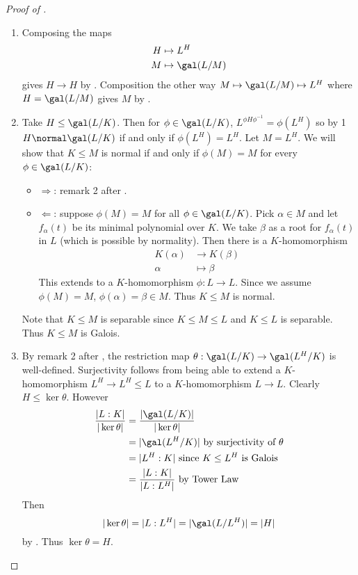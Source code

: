 \documentclass[a4paper]{article}
\begin{document}
\begin{proof}[Proof of ]\leavevmode
  \begin{enumerate}
  \item Composing the maps
    \begin{align*}
      H &\mapsto L^H \\
      M &\mapsto \gal(L/M)
    \end{align*}
    gives \(H \to H\) by . Composition the other way \(M \mapsto \gal(L/M) \mapsto L^H\) where \(H = \gal(L/M)\) gives \(M\) by .
  \item Take \(H \leq \gal(L/K)\). Then for \(\phi \in \gal(L/K)\), \(L^{\phi H \phi^{-1}} = \phi(L^H)\) so by 1 \(H \normal \gal(L/K)\) if and only if \(\phi(L^H) = L^H\). Let \(M = L^H\). We will show that \(K \leq M\) is normal if and only if \(\phi(M) = M\) for every \(\phi \in \gal(L/K)\):
    \begin{itemize}
    \item \(\Rightarrow\): remark 2 after .
    \item \(\Leftarrow\): suppose \(\phi(M) = M\) for all \(\phi \in \gal(L/K)\). Pick \(\alpha \in M\) and let \(f_\alpha(t)\) be its minimal polynomial over \(K\). We take \(\beta\) as a root for \(f_\alpha(t)\) in \(L\) (which is possible by normality). Then there is a \(K\)-homomorphism
      \begin{align*}
        K(\alpha) &\to K(\beta) \\
        \alpha &\mapsto \beta
      \end{align*}
      This extends to a \(K\)-homomorphism \(\phi: L \to L\). Since we assume \(\phi(M) = M\), \(\phi(\alpha) = \beta \in M\). Thus \(K \leq M\) is normal.
    \end{itemize}

    Note that \(K \leq M\) is separable since \(K \leq M \leq L\) and \(K \leq L\) is separable. Thus \(K \leq M\) is Galois.
  \item By remark 2 after , the restriction map \(\theta: \gal(L/K) \to \gal(L^H/K)\) is well-defined. Surjectivity follows from being able to extend a \(K\)-homomorphism \(L^H \to L^H \leq L\) to a \(K\)-homomorphism \(L \to L\). Clearly \(H \leq \ker \theta\). However
    \begin{align*}
      \frac{|L:K|}{|\ker \theta|} &= \frac{|\gal(L/K)|}{|\ker \theta|} \\
                                  &= |\gal(L^H/K)| \text{ by surjectivity of \(\theta\)} \\
                                  &= |L^H:K| \text{ since \(K \leq L^H\) is Galois} \\
                                  &= \frac{|L:K|}{|L:L^H|} \text{ by Tower Law}
    \end{align*}
    Then
    \[
      |\ker \theta| = |L:L^H| = |\gal(L/L^H)| = |H|
    \]
    by . Thus \(\ker \theta = H\).
  \end{enumerate}
\end{proof}
\end{document}

